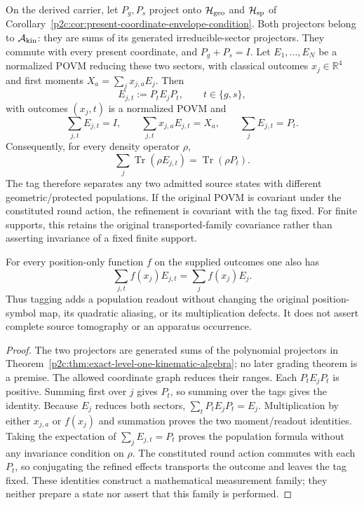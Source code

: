 \documentclass[12pt,a4paper]{article}
\begin{document}
\begin{theorem}
\label{p2c:thm:v2211-central-sector-refinement}
On the derived carrier, let $P_g,P_s$ project onto
$\mathcal H_{\rm geo}$ and $\mathcal H_{\rm sp}$ of
Corollary~\ref{p2c:cor:present-coordinate-envelope-condition}.
Both projectors belong to $\mathcal A_{\rm kin}$: they are sums of its
generated irreducible-sector projectors.  They commute with every present
coordinate, and $P_g+P_s=I$.
Let $E_1,\ldots,E_N$ be a normalized POVM reducing these two sectors,
with classical outcomes $x_j\in\mathbb R^4$ and first moments
$X_a=\sum_jx_{j,a}E_j$.  Then
\[
 E_{j,t}:=P_tE_jP_t,\qquad t\in\{g,s\},
\]
with outcomes $(x_j,t)$ is a normalized POVM and
\[
 \boxed{\sum_{j,t}E_{j,t}=I,\qquad
        \sum_{j,t}x_{j,a}E_{j,t}=X_a,\qquad
        \sum_jE_{j,t}=P_t.}
\]
Consequently, for every density operator $\rho$,
\[
 \boxed{\sum_j\operatorname{Tr}(\rho E_{j,t})
       =\operatorname{Tr}(\rho P_t).}
\]
The tag therefore separates any two admitted source states with different
geometric/protected populations.  If the original POVM is covariant under
the constituted round action, the refinement is covariant with the tag fixed.
For finite supports, this retains the original transported-family covariance
rather than asserting invariance of a fixed finite support.

For every position-only function $f$ on the supplied outcomes one also has
\[
 \boxed{\sum_{j,t}f(x_j)E_{j,t}=\sum_jf(x_j)E_j.}
\]
Thus tagging adds a population readout without changing the original
position-symbol map, its quadratic aliasing, or its multiplication defects.
It does not assert complete source tomography or an apparatus occurrence.
\end{theorem}
\begin{proof}
The two projectors are generated sums of the polynomial projectors in
Theorem~\ref{p2c:thm:exact-level-one-kinematic-algebra}; no later grading
theorem is a premise.  The allowed coordinate graph reduces their ranges.
Each $P_tE_jP_t$ is positive.  Summing first over $j$ gives $P_t$, so
summing over the tags gives the identity.  Because $E_j$ reduces both
sectors, $\sum_tP_tE_jP_t=E_j$.  Multiplication by either $x_{j,a}$ or
$f(x_j)$ and summation proves the two moment/readout identities.
Taking the expectation of $\sum_jE_{j,t}=P_t$ proves the population
formula without any invariance condition on $\rho$.
The constituted round action commutes with each $P_t$, so conjugating
the refined effects transports the outcome and leaves the tag fixed.
These identities construct a mathematical measurement family; they neither
prepare a state nor assert that this family is performed.
\end{proof}
\end{document}
